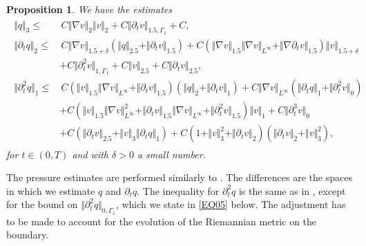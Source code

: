 \documentclass[10pt,reqno]{amsart}
\theoremstyle{plain}
\newtheorem{proposition}[theorem]{Proposition}
\theoremstyle{definition}
\numberwithin{equation}{section}
\newcommand{\Ga}{\Gamma}
\newcommand{\de}{\delta}
\newcommand{\norm}[1]{\Vert#1\Vert}
\def\referee#1{{\color{green}\hbox{\bf ~#1~}}} %
\begin{document}
\begin{proposition}
\label{proposition_pressure_estimates}
We have the estimates
\begin{align}
\begin{split}
\norm{ q }_3  \leq &  \, C \norm{ \nabla v}_2 \norm{ v }_2 + C \norm{ \partial_t v }_{1.5,\Ga_1} + C,
\\
\norm{ \partial_t q}_{2} \leq & \, C \norm{ \nabla v}_{1.5+\de} (\norm{q}_{2.5}
+ \norm{\partial_t v}_{1.5}) + C(\norm{\nabla v}_{1.5} \norm{\nabla v}_{L^\infty} +
\norm{\nabla \partial_t v}_{1.5} ) \norm{ v }_{1.5+\de}
\\
&
+ C \norm{\partial^2_t v}_{1,\Ga_1} + C \norm{v}_{2.5} + C \norm{\partial_t v }_{2.5},
\\
\norm{\partial^2_t q}_1  \leq & \, C (\norm{v}_{1.5} \norm{\nabla v}_{L^\infty} + 
\norm{\partial_t v}_{1.5})( \norm{q}_2 + \norm{\partial_t v}_1 )
+
C \norm{\nabla v}_{L^\infty} ( \norm{\partial_t q}_1 + \norm{\partial^2_t v}_0 )
\\
& 
+ C (\norm{v}_{1.5} \norm{ \nabla v}^2_{L^\infty} + \norm{\partial_t v}_{1.5} \norm{\nabla v}_{L^\infty} + \norm{\partial^2_t v}_{1.5} ) \norm{ v}_1 + C \norm{ \partial^3_t v}_0
\\
& 
+ C (\norm{\partial_t v}_{2.5} + \norm{v}_3 \norm{\partial_t q}_1 )
+ C(1+\norm{v}^2_3 + \norm{\partial_t v}_2)(\norm{\partial_t v}_2 + \norm{v}_3^2 ),
\end{split}
\nonumber
\end{align}
for $t \in (0,T)$ and with $\de > 0$ a small number.
\end{proposition}

The pressure estimates are performed similarly to \cite{IgorMihaelaSurfaceTension}. The
differences
are the spaces in which we estimate $q$ and $\partial_{t}q$.
The inequality for $\partial_{t}^2q$ is the same as in 
\cite{IgorMihaelaSurfaceTension}, except for the bound on 
$\Vert \partial_{t}^2q\Vert_{0,\Gamma_1}$, which 
we state in \eqref{EQ05} below.
The adjustment has to be made to account for the evolution of the Riemannian
metric on the boundary.
\end{document}
